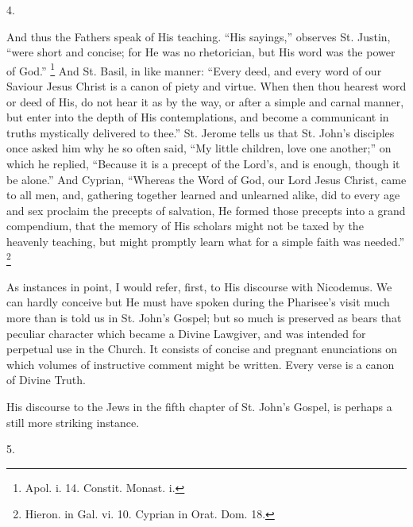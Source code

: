 4.

And thus the Fathers speak of His teaching. ``His
sayings,'' observes St. Justin, ``were short and concise; for
He was no rhetorician, but His word was the power of God.'' \footnote{Apol. i. 14. Constit. Monast. i.} And St. Basil, in like manner: ``Every deed, and every word
of our Saviour Jesus Christ is a canon of piety and virtue. When then
thou hearest word or deed of His, do not hear it as by the way, or
after a simple and carnal manner, but enter into the depth of His
contemplations, and become a communicant in truths mystically
delivered to thee.'' St. Jerome tells us that St. John's disciples
once asked him why he so often said, ``My little children, love
one another;'' on which he replied, ``Because it is a precept
of the Lord's, and is enough, though it be alone.'' And
Cyprian, ``Whereas the Word of God, our Lord Jesus Christ, came to
all men, and, gathering together learned and unlearned alike, did to
every age and sex proclaim the precepts of salvation, He formed those
precepts into a grand compendium, that the memory of His scholars
might not be taxed by the heavenly teaching, but might promptly learn
what for a simple faith was needed.'' \footnote{Hieron. in Gal. vi. 10. Cyprian in Orat.
Dom. 18.}

As instances in point, I would refer, first, to His discourse with
Nicodemus. We can hardly conceive but He must have spoken during the
Pharisee's visit much more than is told us in St. John's Gospel; but
so much is preserved as bears that peculiar character which became a
Divine Lawgiver, and was intended for perpetual use in the Church. It
consists of concise and pregnant enunciations on which volumes of
instructive comment might be written. Every verse is a canon of Divine
Truth.

His discourse to the Jews in the fifth chapter of St. John's
Gospel, is perhaps a still more striking instance.

5.

